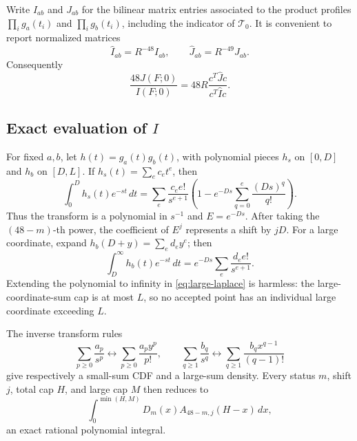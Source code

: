 \documentclass[11pt]{article}
\theoremstyle{definition}
\theoremstyle{remark}
\newcommand{\TT}{\mathcal T}
\begin{document}
Write \(I_{ab}\) and \(J_{ab}\) for the bilinear matrix entries associated to
the product profiles \(\prod_i g_a(t_i)\) and \(\prod_i g_b(t_i)\), including
the indicator of \(\TT_0\).  It is convenient to report normalized matrices
\[
 \widehat I_{ab}=R^{-48}I_{ab},
 \qquad
 \widehat J_{ab}=R^{-49}J_{ab}.
\]
Consequently
\begin{equation}
\label{eq:scaling}
 \frac{48J(F;0)}{I(F;0)}
 =48R\frac{c^{\!T}\widehat Jc}{c^{\!T}\widehat Ic}.
\end{equation}

\subsection{Exact evaluation of \(I\)}

For fixed \(a,b\), let \(h(t)=g_a(t)g_b(t)\), with polynomial pieces
\(h_s\) on \([0,D]\) and \(h_b\) on \([D,L]\).  If
\(h_s(t)=\sum_ec_et^e\), then
\begin{equation}
\label{eq:small-laplace}
 \int_0^D h_s(t)e^{-st}\,dt
 =\sum_e\frac{c_e e!}{s^{e+1}}
 \left(1-e^{-Ds}\sum_{q=0}^e\frac{(Ds)^q}{q!}\right).
\end{equation}
Thus the transform is a polynomial in \(s^{-1}\) and \(E=e^{-Ds}\).
After taking the \((48-m)\)-th power, the coefficient of \(E^j\) represents a
shift by \(jD\).  For a large coordinate, expand
\(h_b(D+y)=\sum_ed_ey^e\); then
\begin{equation}
\label{eq:large-laplace}
 \int_D^\infty h_b(t)e^{-st}\,dt
 =e^{-Ds}\sum_e\frac{d_e e!}{s^{e+1}}.
\end{equation}
Extending the polynomial to infinity in \eqref{eq:large-laplace} is harmless:
the large-coordinate-sum cap is at most \(L\), so no accepted point has an
individual large coordinate exceeding \(L\).

The inverse transform rules
\[
 \sum_{p\geq0}\frac{a_p}{s^p}
 \longleftrightarrow
 \sum_{p\geq0}\frac{a_p y^p}{p!},
 \qquad
 \sum_{q\geq1}\frac{b_q}{s^q}
 \longleftrightarrow
 \sum_{q\geq1}\frac{b_q x^{q-1}}{(q-1)!}
\]
give respectively a small-sum CDF and a large-sum density.  Every status
\(m\), shift \(j\), total cap \(H\), and large cap \(M\) then reduces to
\begin{equation}
\label{eq:capped-convolution}
 \int_0^{\min(H,M)}D_m(x)A_{48-m,j}(H-x)\,dx,
\end{equation}
an exact rational polynomial integral.
\end{document}
